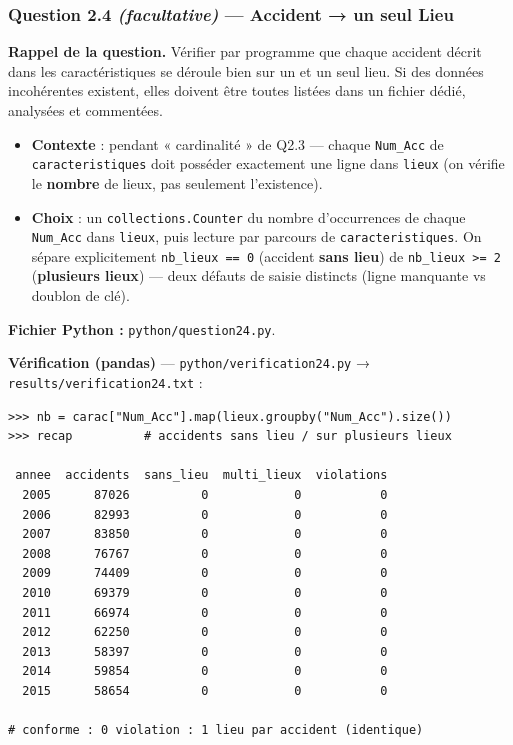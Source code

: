 \documentclass[11pt,a4paper]{article}
\newcommand{\rub}[2]{\textbf{\textcolor{#1}{#2}}}
\begin{document}
\clearpage
\subsubsection*{Question 2.4 \emph{(facultative)} — Accident → un seul Lieu}

\rub{labrappel}{Rappel de la question.} Vérifier par programme que chaque accident décrit dans les caractéristiques se déroule bien sur un et un seul lieu. Si des données incohérentes existent, elles doivent être toutes listées dans un fichier dédié, analysées et commentées.

\begin{agentbox}
\begin{itemize}
\item \textbf{Contexte} : pendant « cardinalité » de Q2.3 — chaque \texttt{Num\_Acc} de \texttt{caracteristiques} doit posséder exactement une ligne dans \texttt{lieux} (on vérifie le \textbf{nombre} de lieux, pas seulement l'existence).
\item \textbf{Choix} : un \texttt{collections.Counter} du nombre d'occurrences de chaque \texttt{Num\_Acc} dans \texttt{lieux}, puis lecture par parcours de \texttt{caracteristiques}. On sépare explicitement \texttt{nb\_lieux == 0} (accident \textbf{sans lieu}) de \texttt{nb\_lieux >= 2} (\textbf{plusieurs lieux}) — deux défauts de saisie distincts (ligne manquante vs doublon de clé).
\end{itemize}
\end{agentbox}

\rub{labfichier}{Fichier Python :} \texttt{python/question24.py}.

\rub{labverif}{Vérification (pandas)} --- \texttt{python/verification24.py} → \texttt{results/verification24.txt} :

\begin{lstlisting}[style=pyblock]
>>> nb = carac["Num_Acc"].map(lieux.groupby("Num_Acc").size())
>>> recap          # accidents sans lieu / sur plusieurs lieux

 annee  accidents  sans_lieu  multi_lieux  violations
  2005      87026          0            0           0
  2006      82993          0            0           0
  2007      83850          0            0           0
  2008      76767          0            0           0
  2009      74409          0            0           0
  2010      69379          0            0           0
  2011      66974          0            0           0
  2012      62250          0            0           0
  2013      58397          0            0           0
  2014      59854          0            0           0
  2015      58654          0            0           0

# conforme : 0 violation : 1 lieu par accident (identique)
\end{lstlisting}
\end{document}
